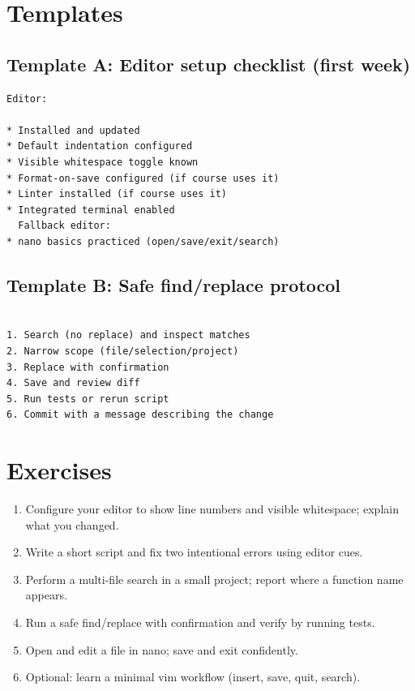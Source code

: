 \section{Templates}
\subsection{Template A: Editor setup checklist (first week)}
\begin{verbatim}
Editor:

* Installed and updated
* Default indentation configured
* Visible whitespace toggle known
* Format-on-save configured (if course uses it)
* Linter installed (if course uses it)
* Integrated terminal enabled
  Fallback editor:
* nano basics practiced (open/save/exit/search)
  \end{verbatim}

\subsection{Template B: Safe find/replace protocol}
\begin{verbatim}

1. Search (no replace) and inspect matches
2. Narrow scope (file/selection/project)
3. Replace with confirmation
4. Save and review diff
5. Run tests or rerun script
6. Commit with a message describing the change
   \end{verbatim}

\section{Exercises}
\begin{enumerate}
\item Configure your editor to show line numbers and visible whitespace; explain what you changed.
\item Write a short script and fix two intentional errors using editor cues.
\item Perform a multi-file search in a small project; report where a function name appears.
\item Run a safe find/replace with confirmation and verify by running tests.
\item Open and edit a file in nano; save and exit confidently.
\item Optional: learn a minimal vim workflow (insert, save, quit, search).
\end{enumerate}

